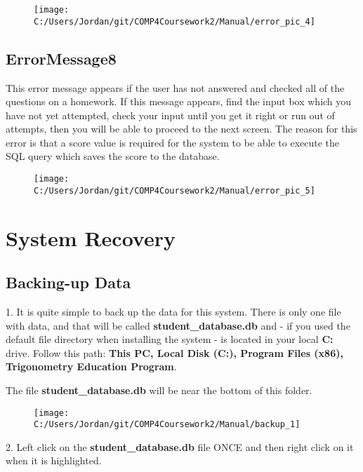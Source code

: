 \begin{figure}[H]
    \texttt{[image: C:/Users/Jordan/git/COMP4Coursework2/Manual/error\_pic\_4]}
\end{figure}

\subsection{ErrorMessage8}

This error message appears if the user has not answered and checked all of the questions on a homework. If this message appears, find the input box which you have not yet attempted, check your input until you get it right or run out of attempts, then you will be able to proceed to the next screen. The reason for this error is that a score value is required for the system to be able to execute the SQL query which saves the score to the database.

\begin{figure}[H]
    \texttt{[image: C:/Users/Jordan/git/COMP4Coursework2/Manual/error\_pic\_5]}
\end{figure}

\section{System Recovery}

\subsection{Backing-up Data}

1. It is quite simple to back up the data for this system. There is only one file with data, and that will be called \textbf{student\_database.db} and - if you used the default file directory when installing the system - is located in your local \textbf{C:} drive. Follow this path: \textbf{This PC, Local Disk (C:), Program Files (x86), Trigonometry Education Program}.

The file \textbf{student\_database.db} will be near the bottom of this folder.

\begin{figure}[H]
    \texttt{[image: C:/Users/Jordan/git/COMP4Coursework2/Manual/backup\_1]}
\end{figure}

2. Left click on the \textbf{student\_database.db} file ONCE and then right click on it when it is highlighted.

